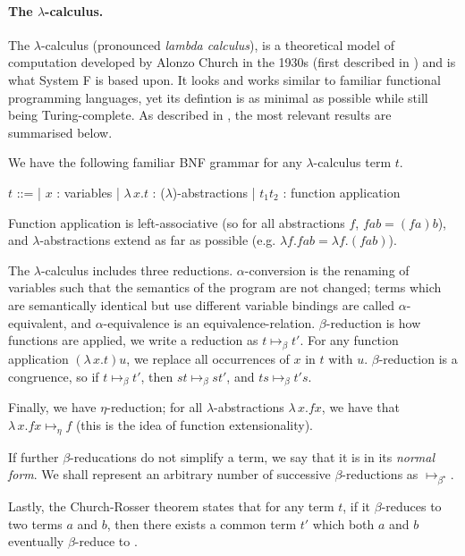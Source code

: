 \documentclass[logo,bsc,singlespacing,parskip,online]{infthesis}
\begin{document}
\paragraph*{The $\lambda$-calculus.} The $\lambda$-calculus (pronounced
\textit{lambda calculus}), is a theoretical model of computation developed by
Alonzo Church in the 1930s (first described in \citet{church_set_1932}) and is
what System F is based upon. It looks and works similar to familiar functional
programming languages, yet its defintion is as minimal as possible while still
being Turing-complete. As described in \cite{pierce_types_2002}, the most
relevant results are summarised below.

We have the following familiar BNF grammar for any $\lambda$-calculus term $t$.

\begin{center}
\begin{bnf}
  $t$ ::=
  | $x$ : variables
  | $\lambda \, x. t$ : ($\lambda$)-abstractions
  | $t_1 t_2$ : function application
\end{bnf}
\end{center}

Function application is left-associative (so for all abstractions $f$, $f a b =
(f a) b$), and $\lambda$-abstractions extend as far as possible (e.g. $\lambda
f. f a b = \lambda f. (f a b)$).

The $\lambda$-calculus includes three reductions. $\alpha$-conversion is the
renaming of variables such that the semantics of the program are not changed;
terms which are semantically identical but use different variable bindings are
called $\alpha$-equivalent, and $\alpha$-equivalence is an equivalence-relation.
$\beta$-reduction is how functions are applied, we write a reduction as $t
\mapsto_{\beta} t'$. For any function application $(\lambda \, x. t) u$, we
replace all occurrences of $x$ in $t$ with $u$. $\beta$-reduction is a
congruence, so if $t \mapsto_{\beta} t'$, then $st \mapsto_{\beta} st'$, and $ts
\mapsto_{\beta} t's$.

Finally, we have $\eta$-reduction; for all $\lambda$-abstractions $\lambda \, x.
f x$, we have that $\lambda \, x. f x \mapsto_{\eta} f$ (this is the idea of
function extensionality).
  
If further $\beta$-reducations do not simplify a term, we say that it is in its
\textit{normal form}. We shall represent an arbitrary number of successive
$\beta$-reductions as $\mapsto_{\beta^{\star}}$.

Lastly, the Church-Rosser theorem states that for any term $t$, if it
$\beta$-reduces to two terms $a$ and $b$, then there exists a common term $t'$
which both $a$ and $b$ eventually $\beta$-reduce to
\citep{church_properties_1936}.
\end{document}
